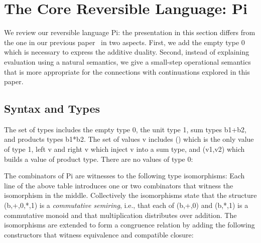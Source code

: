 \documentclass[preprint]{sigplanconf}
\begin{document}
\section{The Core Reversible Language: {{Pi}} }
\label{sec:pi}

We review our reversible language {{Pi}}: the presentation in this
section differs from the one in our previous paper~\cite{infeffects} in two
aspects. First, we add the empty type {{0}} which is necessary to express the
additive duality. Second, instead of explaining evaluation using a natural
semantics, we give a small-step operational semantics that is more
appropriate for the connections with continuations explored in this paper.

\subsection{Syntax and Types} 
\label{sec:pi-syntax}

The set of types includes the empty type {{0}}, the unit type {{1}}, sum
types {{b1+b2}}, and products types {{b1*b2}}. The set of values {{v}}
includes {{()}} which is the only value of type {{1}}, {{left v}} and {{right v}} 
which inject {{v}} into a sum type, and {{(v1,v2)}} which builds a
value of product type. There are no values of type {{0}}:

The combinators of {{Pi}} are witnesses to the following type
isomorphisms: 
Each line of the above table introduces one or two combinators that witness
the isomorphism in the middle. Collectively the isomorphisms state that the
structure {{(b,+,0,*,1)}} is a \emph{commutative semiring}, i.e., that each
of {{(b,+,0)}} and {{(b,*,1)}} is a commutative monoid and that
multiplication distributes over addition. The isomorphisms are extended to
form a congruence relation by adding the following constructors that witness
equivalence and compatible closure:
%
%
%
\end{document}
